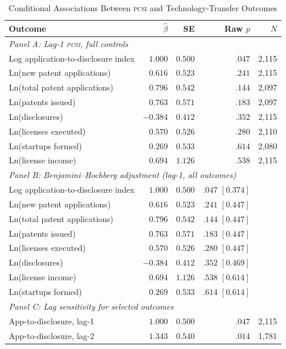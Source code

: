 \documentclass[12pt]{article}
\newcommand{\PCSI}{\textsc{pcsi}}
\begin{document}
\begin{table}[htbp]
\centering
\caption{Conditional Associations Between \PCSI{} and Technology-Transfer Outcomes}
\label{tab:main}
\begin{threeparttable}
\begin{tabular}{lrrrr}
\toprule
Outcome & $\hat\beta$ & SE & Raw $p$ & $N$ \\
\midrule
\multicolumn{5}{l}{\textit{Panel A: Lag-1 \PCSI{}, full controls}} \\[2pt]
Log application-to-disclosure index & $1.000$ & $0.500$ & $.047$ & 2,115 \\
Ln(new patent applications) & $0.616$ & $0.523$ & $.241$ & 2,115 \\
Ln(total patent applications) & $0.796$ & $0.542$ & $.144$ & 2,097 \\
Ln(patents issued) & $0.763$ & $0.571$ & $.183$ & 2,097 \\
Ln(disclosures) & $-0.384$ & $0.412$ & $.352$ & 2,115 \\
Ln(licenses executed) & $0.570$ & $0.526$ & $.280$ & 2,110 \\
Ln(startups formed) & $0.269$ & $0.533$ & $.614$ & 2,080 \\
Ln(license income) & $0.694$ & $1.126$ & $.538$ & 2,115 \\
\midrule
\multicolumn{5}{l}{\textit{Panel B: Benjamini--Hochberg adjustment (lag-1, all outcomes)}} \\[2pt]
Log application-to-disclosure index & $1.000$ & $0.500$ & $.047$ $[0.374]$ & \\
Ln(new patent applications) & $0.616$ & $0.523$ & $.241$ $[0.447]$ & \\
Ln(total patent applications) & $0.796$ & $0.542$ & $.144$ $[0.447]$ & \\
Ln(patents issued) & $0.763$ & $0.571$ & $.183$ $[0.447]$ & \\
Ln(licenses executed) & $0.570$ & $0.526$ & $.280$ $[0.447]$ & \\
Ln(disclosures) & $-0.384$ & $0.412$ & $.352$ $[0.469]$ & \\
Ln(license income) & $0.694$ & $1.126$ & $.538$ $[0.614]$ & \\
Ln(startups formed) & $0.269$ & $0.533$ & $.614$ $[0.614]$ & \\
\midrule
\multicolumn{5}{l}{\textit{Panel C: Lag sensitivity for selected outcomes}} \\[2pt]
App-to-disclosure, lag-1 & $1.000$ & $0.500$ & $.047$ & 2,115 \\
App-to-disclosure, lag-2 & $1.343$ & $0.540$ & $.014$ & 1,781 \\

\end{tabular}
\end{threeparttable}
\end{table}
\end{document}
